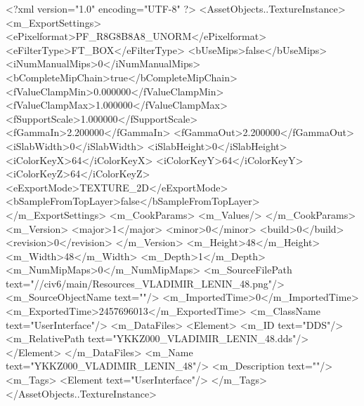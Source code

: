 <?xml version="1.0" encoding="UTF-8" ?>
<AssetObjects..TextureInstance>
	<m_ExportSettings>
		<ePixelformat>PF_R8G8B8A8_UNORM</ePixelformat>
		<eFilterType>FT_BOX</eFilterType>
		<bUseMips>false</bUseMips>
		<iNumManualMips>0</iNumManualMips>
		<bCompleteMipChain>true</bCompleteMipChain>
		<fValueClampMin>0.000000</fValueClampMin>
		<fValueClampMax>1.000000</fValueClampMax>
		<fSupportScale>1.000000</fSupportScale>
		<fGammaIn>2.200000</fGammaIn>
		<fGammaOut>2.200000</fGammaOut>
		<iSlabWidth>0</iSlabWidth>
		<iSlabHeight>0</iSlabHeight>
		<iColorKeyX>64</iColorKeyX>
		<iColorKeyY>64</iColorKeyY>
		<iColorKeyZ>64</iColorKeyZ>
		<eExportMode>TEXTURE_2D</eExportMode>
		<bSampleFromTopLayer>false</bSampleFromTopLayer>
	</m_ExportSettings>
	<m_CookParams>
		<m_Values/>
	</m_CookParams>
	<m_Version>
		<major>1</major>
		<minor>0</minor>
		<build>0</build>
		<revision>0</revision>
	</m_Version>
	<m_Height>48</m_Height>
	<m_Width>48</m_Width>
	<m_Depth>1</m_Depth>
	<m_NumMipMaps>0</m_NumMipMaps>
	<m_SourceFilePath text="//civ6/main/Resources_VLADIMIR_LENIN_48.png"/>
	<m_SourceObjectName text=""/>
	<m_ImportedTime>0</m_ImportedTime>
	<m_ExportedTime>2457696013</m_ExportedTime>
	<m_ClassName text="UserInterface"/>
	<m_DataFiles>
		<Element>
			<m_ID text="DDS"/>
			<m_RelativePath text="YKKZ000_VLADIMIR_LENIN_48.dds"/>
		</Element>
	</m_DataFiles>
	<m_Name text="YKKZ000_VLADIMIR_LENIN_48"/>
	<m_Description text=""/>
	<m_Tags>
		<Element text="UserInterface"/>
	</m_Tags>
</AssetObjects..TextureInstance>

